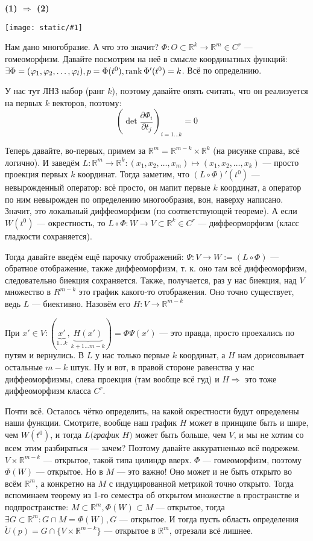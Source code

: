 \documentclass{article}
\def\image#1{\texttt{[image: static/\#1]}}
\begin{document}
\textbf{(1) $\Rightarrow$ (2)}

\image{glad_mnogoobr.png}

Нам дано многобразие. А что это значит? $\Phi: O \subset \mathbb{R}^k \rightarrow \mathbb{R}^m \in C^r$ --- гомеоморфизм. Давайте посмотрим на неё в смысле координатных функций: $\exists \Phi = (\varphi_1, \varphi_2, \ldots, \varphi_l), p = \Phi(t^0), \rank \Phi'(t^0) = k$. Всё по определнию. 

У нас тут ЛНЗ набор (ранг $k$), поэтому давайте опять считать, что он реализуется на первых $k$ векторов, поэтому: 
\[\left(\det \frac{\partial \Phi_i}{\partial t_j}\right)_{i = 1 \ldots k} = 0\]

Теперь давайте, во-первых, примем за $\mathbb{R}^m = \mathbb{R}^{m - k} \times \mathbb{R}^k$ (на рисунке справа, всё логично). И заведём $L: \mathbb{R}^m \rightarrow \mathbb{R}^k: (x_1, x_2, \ldots, x_m) \mapsto (x_1, x_2, \ldots, x_k)$ --- просто проекция первых $k$ координат. Тогда заметим, что $(L \circ \Phi)'(t^0)$ --- невырожденный оператор: всё просто, он мапит первые $k$ координат, а оператор по ним невырожден по определению многообразия, вон, наверху написано. Значит, это локальный диффеоморфизм (по соответствующей теореме). А если $W(t^0)$ --- окрестность, то $L \circ \Phi: W \rightarrow V \subset \mathbb{R}^k \in C^r$ --- диффеорморфизм (класс гладкости сохраняется).

Тогда давайте введём ещё парочку отображений: $\Psi: V \rightarrow W := (L \circ \Phi)$ --- обратное отображение, также диффеоморфизм, т. к. оно там всё диффеоморфизм, следовательно биекция сохраняется. Также, получается, раз у нас биекция, над $V$ множество в $R^{m - k}$ это график какого-то отображения. Оно точно существует, ведь $L$ --- биективно. Назовём его $H: V \rightarrow \mathbb{R}^{m - k}$

При $x' \in V: (\underbrace{x'}_{1 \ldots k}, \underbrace{H(x')}_{k + 1 \ldots m - k}) = \Phi\Psi(x')$ --- это правда, просто проехались по путям и вернулись. В $L$ у нас только первые $k$ координат, а $H$ нам дорисовывает остальные $m - k$ штук. Ну и вот, в правой стороне равенства у нас диффеоморфизмы, слева проекция (там вообще всё гуд) и $H \Rightarrow$ это тоже диффеоморфизм класса $C^r$. 

Почти всё. Осталось чётко определить, на какой окрестности будут определены наши функции. Смотрите, вообще наш график $H$ может в принципе быть и шире, чем $W(t^0)$, и тогда $L($\textit{график} $H)$ может быть больше, чем $V$, и мы не хотим со всем этим разбираться --- зачем? Поэтому давайте аккуратненько всё подрежем. $V \times \mathbb{R}^{m - k}$ --- открытое, такой типа цилиндр вверх. $\Phi$ --- гомеоморфизм, поэтому $\Phi(W)$ --- открытое. Но в $M$ --- это важно! Оно может и не быть открыто во всём $\mathbb{R}^m$, а конкретно на $M$ с индуцированной метрикой точно открыто. Тогда вспоминаем теорему из 1-го семестра об открытом множестве в пространстве и подпространстве: $M \subset \mathbb{R}^m, \Phi(W) \subset M$ --- открытое, тогда $\exists G \subset \mathbb{R}^m: G \cap M = \Phi(W), G$ --- открытое. И тогда пусть область определения $\widetilde{U}(p) = G \cap \{V \times \mathbb{R}^{m - k}\}$ --- открытое в $\mathbb{R}^m$, отрезали всё лишнее. 
\end{document}
